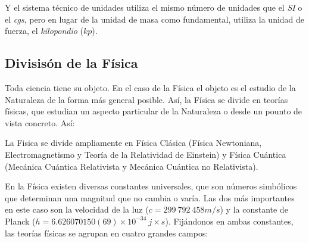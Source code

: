 \documentclass[11pt, oneside, titlepage]{article}
\begin{document}
Y el sistema técnico de unidades utiliza el mismo número de unidades que el \emph{SI} o el \emph{cgs}, pero en lugar de la unidad de masa como fundamental, utiliza la unidad de fuerza, el \emph{kilopondio} ($kp$).

\subsection{Divisisón de la Física}
Toda ciencia tiene su objeto. En el caso de la Física el objeto es el estudio de la Naturaleza de la forma más general posible. Así, la Física se divide en teorías físicas, que estudian un aspecto particular de la Naturaleza o desde un pounto de vista concreto. Así:

La Fisica se divide ampliamente en Física Clásica (Física Newtoniana, Electromagnetismo y Teoría de la Relatividad de Einstein) y Física Cuántica (Mecánica Cuántica Relativista y Mecánica Cuántica no Relativista).

En la Física existen diversas constantes universales, que son números simbólicos que determinan una magnitud que no cambia o varía. Las dos más importantes en este caso son la velocidad de la luz ($c = 299\ 792\ 458 m/s$) y la constante de Planck ($h = 6.626070150(69) \times 10^{-34}\ j \times s$). Fijándonos en ambas constantes, las teorías físicas se agrupan en cuatro grandes campos:
\end{document}
